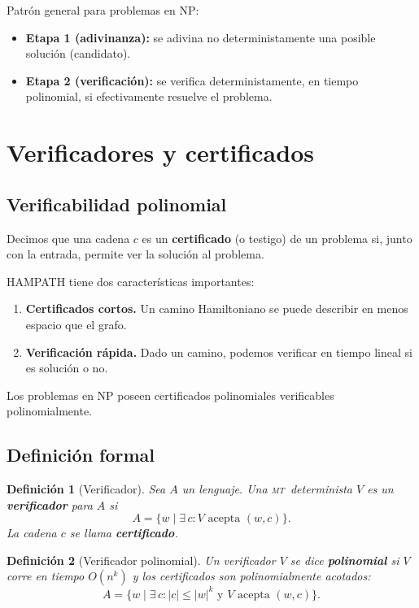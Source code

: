 \documentclass[11pt,a4paper]{article}
\theoremstyle{definicion}
\newtheorem{definicion}{Definici\'on}[section]
\newcommand{\MT}{\textsc{mt}}
\newcommand{\NP}{\mathrm{NP}}
\begin{document}
\begin{idea}
Patr\'on general para problemas en $\NP$:
\begin{itemize}
    \item \textbf{Etapa 1 (adivinanza):} se adivina no deterministamente una posible soluci\'on (candidato).
    \item \textbf{Etapa 2 (verificaci\'on):} se verifica deterministamente, en tiempo polinomial, si efectivamente resuelve el problema.
\end{itemize}
\end{idea}

\section{Verificadores y certificados}

\subsection{Verificabilidad polinomial}

Decimos que una cadena $c$ es un \textbf{certificado} (o testigo) de un problema si, junto con la entrada, permite ver la soluci\'on al problema.

HAMPATH tiene dos caracter\'isticas importantes:
\begin{enumerate}
    \item \textbf{Certificados cortos.} Un camino Hamiltoniano se puede describir en menos espacio que el grafo.
    \item \textbf{Verificaci\'on r\'apida.} Dado un camino, podemos verificar en tiempo lineal si es soluci\'on o no.
\end{enumerate}

Los problemas en $\NP$ poseen certificados polinomiales verificables polinomialmente.

\subsection{Definici\'on formal}

\begin{definicion}[Verificador]
Sea $A$ un lenguaje. Una \MT\ determinista $V$ es un \textbf{verificador} para $A$ si
\[
A = \{ w \mid \exists\, c : V \text{ acepta } (w, c)\}.
\]
La cadena $c$ se llama \textbf{certificado}.
\end{definicion}

\begin{definicion}[Verificador polinomial]
Un verificador $V$ se dice \textbf{polinomial} si $V$ corre en tiempo $O(n^k)$ y los certificados son polinomialmente acotados:
\[
A = \{ w \mid \exists\, c : |c| \leq |w|^k \text{ y } V \text{ acepta } (w, c)\}.
\]
\end{definicion}
\end{document}
